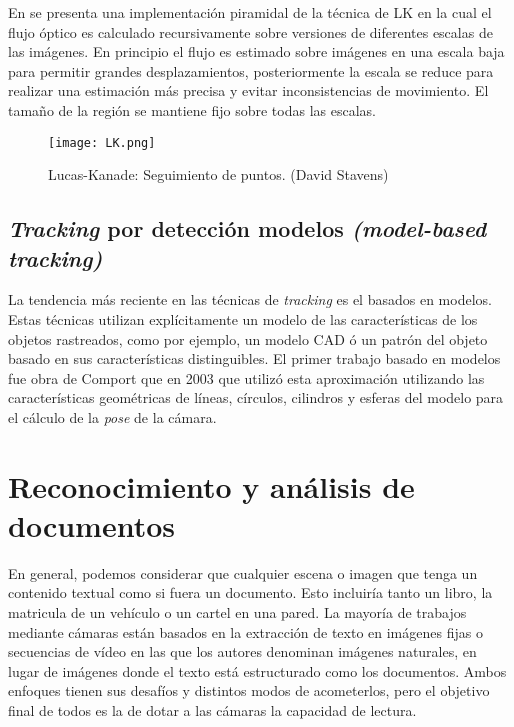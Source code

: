En \cite{Bouguet} se presenta una implementación piramidal de la técnica de LK en la cual el flujo óptico es calculado recursivamente sobre versiones de diferentes escalas de las imágenes. En principio el flujo es estimado sobre imágenes en una escala baja para permitir grandes desplazamientos, posteriormente la escala se reduce para realizar una estimación más precisa  y evitar inconsistencias de movimiento. El tamaño de la región se mantiene fijo sobre todas las escalas.

\begin{figure}
  \centering
  \texttt{[image: LK.png]}
  \caption{Lucas-Kanade: Seguimiento de puntos. (David Stavens)}
  \label{fig:overviewLK}
\end{figure}

\subsection{\textit{Tracking} por detección modelos \emph{(model-based tracking)}}
La tendencia más reciente en las técnicas de \textit{tracking} es el basados en modelos. Estas técnicas utilizan explícitamente un modelo de las características de los objetos rastreados, como por ejemplo, un modelo CAD ó un patrón del objeto basado en sus características distinguibles. El primer trabajo basado en modelos fue obra de Comport \cite{Comport} que en 2003 que utilizó esta aproximación utilizando las características geométricas de líneas, círculos, cilindros y esferas del modelo para el cálculo de la \textit{pose} de la cámara.  

\section{Reconocimiento y análisis de documentos}

En general, podemos considerar que cualquier escena o imagen que tenga un contenido textual como si fuera un documento. Esto incluiría tanto un libro, la matricula de un vehículo o un cartel en una pared. La mayoría de trabajos mediante cámaras están basados en la extracción de texto en imágenes fijas o secuencias de vídeo en las que los autores denominan imágenes naturales, en lugar de imágenes donde el texto está estructurado como los documentos. Ambos enfoques tienen sus desafíos y distintos modos de acometerlos, pero el objetivo final de todos es la de dotar a las cámaras la capacidad de lectura.

